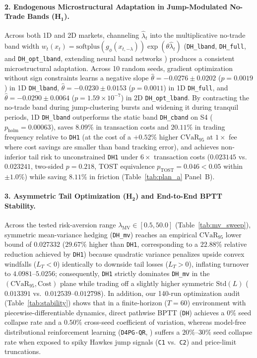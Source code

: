 \documentclass[11pt,a4paper]{article}
\begin{document}
\paragraph{2. Endogenous Microstructural Adaptation in Jump-Modulated No-Trade Bands ($\mathbf{H_1}$).}
Across both 1D and 2D markets, channeling $\hat{\lambda}_t$ into the multiplicative no-trade band width $w_t(x_t) = \text{softplus}(g_\phi(x_{t,-\lambda}))\exp(\theta\hat{\lambda}_t)$ (\texttt{DH\_lband}, \texttt{DH\_full}, and \texttt{DH\_opt\_lband}, extending neural band networks \citealt{Imaki2023,Luetkebohmert2022}) produces a consistent microstructural adaptation. Across 10 random seeds, gradient optimization without sign constraints learns a negative slope $\hat{\theta} = -0.0276 \pm 0.0202$ ($p = 0.0019$) in 1D \texttt{DH\_lband}, $\hat{\theta} = -0.0230 \pm 0.0153$ ($p = 0.0011$) in 1D \texttt{DH\_full}, and $\hat{\theta} = -0.0290 \pm 0.0064$ ($p = 1.59 \times 10^{-7}$) in 2D \texttt{DH\_opt\_lband}. By contracting the no-trade band during jump-clustering bursts and widening it during tranquil periods, 1D \texttt{DH\_lband} outperforms the static band \texttt{DH\_cband} on S4 ($p_{\text{holm}} = 0.00063$), saves $8.09\%$ in transaction costs and $20.11\%$ in trading frequency relative to \texttt{DH1} (at the cost of a $+0.52\%$ higher $\text{CVaR}_{95}$ at $1\times$ fee where cost savings are smaller than band tracking error), and achieves non-inferior tail risk to unconstrained \texttt{DH1} under $6\times$ transaction costs ($0.023145$ vs.\ $0.023241$, two-sided $p = 0.218$, TOST equivalence $p_{\text{TOST}} = 0.046 < 0.05$ within $\pm 1.0\%$) while saving $8.11\%$ in friction (Table~\ref{tab:plan_a} Panel~B).

\paragraph{3. Asymmetric Tail Optimization ($\mathbf{H_2}$) and End-to-End BPTT Stability.}
Across the tested risk-aversion range $\lambda_{\text{MV}} \in [0.5, 50.0]$ (Table~\ref{tab:mv_sweep}), symmetric mean-variance hedging (\texttt{DH\_mv}) reaches an empirical $\text{CVaR}_{95}$ lower bound of $0.027332$ ($29.67\%$ higher than \texttt{DH1}, corresponding to a $22.88\%$ relative reduction achieved by \texttt{DH1}) because quadratic variance penalizes upside convex windfalls ($L_T < 0$) identically to downside tail losses ($L_T > 0$), inflating turnover to $4.0981\text{--}5.0256$; consequently, \texttt{DH1} strictly dominates \texttt{DH\_mv} in the $(\text{CVaR}_{95}, \text{Cost})$ plane while trading off a slightly higher symmetric $\text{Std}(L)$ ($0.013391$ vs.\ $0.012539\text{--}0.012798$). In addition, our 140-run optimization audit (Table~\ref{tab:stability}) shows that in a finite-horizon ($T = 60$) environment with piecewise-differentiable dynamics, direct pathwise BPTT (\texttt{DH}) achieves a $0\%$ seed collapse rate and a $0.50\%$ cross-seed coefficient of variation, whereas model-free distributional reinforcement learning (\texttt{D4PG-QR}, \citealt{Cao2023,ChenHu2026}) suffers a $20\%\text{--}30\%$ seed collapse rate when exposed to spiky Hawkes jump signals (\texttt{C1} vs.\ \texttt{C2}) and price-limit truncations.
\end{document}

